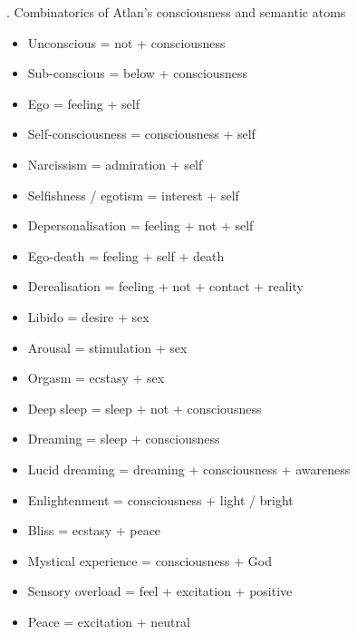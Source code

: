 \begin{multicols}{2}
. Combinatorics of Atlan’s consciousness and semantic atoms  
\begin{itemize}
\item   Unconscious = not + consciousness 

\item   Sub-conscious = below + consciousness 

\item   Ego = feeling + self 

\item   Self-consciousness = consciousness + self 

\item   Narcissism = admiration + self 

\item   Selfishness / egotism = interest + self 

\item   Depersonalisation = feeling + not + self 

\item   Ego-death = feeling + self + death 

\item   Derealisation = feeling + not + contact + reality  

\item   Libido = desire + sex 

\item   Arousal = stimulation + sex 

\item   Orgasm = ecstasy + sex 

\item   Deep sleep = sleep + not + consciousness 

\item   Dreaming = sleep + consciousness 

\item   Lucid dreaming = dreaming + consciousness + awareness 

\item   Enlightenment = consciousness + light / bright 

\item   Bliss = ecstasy + peace 

\item   Mystical experience = consciousness + God 

\item   Sensory overload = feel + excitation + positive 

\item   Peace = excitation + neutral 


\end{itemize}
\end{multicols}

